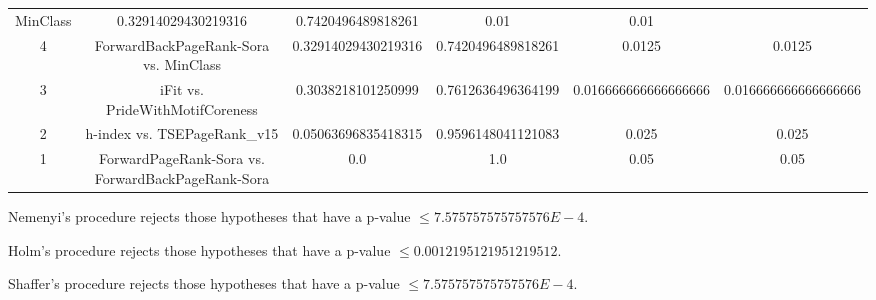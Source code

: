 \documentclass[a4paper,10pt]{article}
\begin{document}
\begin{landscape}
\begin{table}[!htp]
\begin{tabular}{cccccc}
MinClass&0.32914029430219316&0.7420496489818261&0.01&0.01\\4&ForwardBackPageRank-Sora vs. MinClass&0.32914029430219316&0.7420496489818261&0.0125&0.0125\\3&iFit vs. PrideWithMotifCoreness&0.3038218101250999&0.7612636496364199&0.016666666666666666&0.016666666666666666\\2&h-index vs. TSEPageRank_v15&0.05063696835418315&0.9596148041121083&0.025&0.025\\1&ForwardPageRank-Sora vs. ForwardBackPageRank-Sora&0.0&1.0&0.05&0.05\\\hline
\end{tabular}
\end{table}
Nemenyi's procedure rejects those hypotheses that have a p-value $\le7.575757575757576E-4$.


Holm's procedure rejects those hypotheses that have a p-value $\le0.0012195121951219512$.


Shaffer's procedure rejects those hypotheses that have a p-value $\le7.575757575757576E-4$.



\end{landscape}
\end{document}
